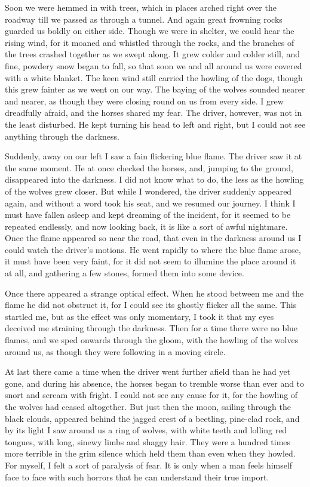 Soon we were hemmed in with trees, which in places arched right over the roadway till we passed as through a tunnel. And again great frowning rocks guarded us boldly on either side. Though we were in shelter, we could hear the rising wind, for it moaned and whistled through the rocks, and the branches of the trees crashed together as we swept along. It grew colder and colder still, and fine, powdery snow began to fall, so that soon we and all around us were covered with a white blanket. The keen wind still carried the howling of the dogs, though this grew fainter as we went on our way. The baying of the wolves sounded nearer and nearer, as though they were closing round on us from every side. I grew dreadfully afraid, and the horses shared my fear. The driver, however, was not in the least disturbed. He kept turning his head to left and right, but I could not see anything through the darkness. 

Suddenly, away on our left I saw a fain flickering blue flame. The driver saw it at the same moment. He at once checked the horses, and, jumping to the ground, disappeared into the darkness. I did not know what to do, the less as the howling of the wolves grew closer. But while I wondered, the driver suddenly appeared again, and without a word took his seat, and we resumed our journey. I think I must have fallen asleep and kept dreaming of the incident, for it seemed to be repeated endlessly, and now looking back, it is like a sort of awful nightmare. Once the flame appeared so near the road, that even in the darkness around us I could watch the driver's motions. He went rapidly to where the blue flame arose, it must have been very faint, for it did not seem to illumine the place around it at all, and gathering a few stones, formed them into some device. 

Once there appeared a strange optical effect. When he stood between me and the flame he did not obstruct it, for I could see its ghostly flicker all the same. This startled me, but as the effect was only momentary, I took it that my eyes deceived me straining through the darkness. Then for a time there were no blue flames, and we sped onwards through the gloom, with the howling of the wolves around us, as though they were following in a moving circle. 

At last there came a time when the driver went further afield than he had yet gone, and during his absence, the horses began to tremble worse than ever and to snort and scream with fright. I could not see any cause for it, for the howling of the wolves had ceased altogether. But just then the moon, sailing through the black clouds, appeared behind the jagged crest of a beetling, pine-clad rock, and by its light I saw around us a ring of wolves, with white teeth and lolling red tongues, with long, sinewy limbs and shaggy hair. They were a hundred times more terrible in the grim silence which held them than even when they howled. For myself, I felt a sort of paralysis of fear. It is only when a man feels himself face to face with such horrors that he can understand their true import. 

